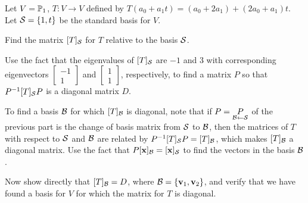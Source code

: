 \begin{activity} \label{act:8_c_lt_diag} Let $V = \mathbb{P}_1$, $T : V \to V$ defined by $T(a_0+a_1t) = (a_0+2a_1) + (2a_0+a_1)t$. Let $\mathcal{S} = \{1, t\}$ be the standard basis for $V$.
	\ba
	\item Find the matrix $[T]_{\mathcal{S}}$ for $T$ relative to the basis $\mathcal{S}$.
	
	\item Use the fact that the eigenvalues of $[T]_{\mathcal{S}}$ are $-1$ and 3 with corresponding eigenvectors $\left[ \begin{array}{r} -1 \\ 1 \end{array} \right]$ and $\left[ \begin{array}{c} 1 \\ 1 \end{array} \right]$, respectively, to find a matrix $P$ so that $P^{-1}[T]_{\mathcal{S}}P$ is a diagonal matrix $D$.

	\item To find a basis $\mathcal{B}$ for which $[T]_{\mathcal{B}}$ is diagonal, note that if $P= \underset{\mathcal{B} \leftarrow \mathcal{S}}{P}$ of the previous part is the change of basis matrix from $\mathcal{S}$ to $\mathcal{B}$, then the matrices of $T$ with respect to $\mathcal{S}$ and $\mathcal{B}$ are related by $P^{-1} [T]_{\mathcal{S}} P = [T]_{\mathcal{B}}$, which makes $[T]_{\mathcal{B}}$ a diagonal matrix. Use the fact that $P[\mathbf{x}]_{\mathcal{B}}=[\mathbf{x}]_{\mathcal{S}}$ to find the vectors in the basis $\mathcal{B}$.
	


	\item Now show directly that $[T]_{\mathcal{B}} = D$, where $\mathcal{B} = \{\mathbf{v}_1, \mathbf{v}_2\}$, and verify that we have found a basis for $V$ for which the matrix for $T$ is diagonal.

	\ea
	
\end{activity}

